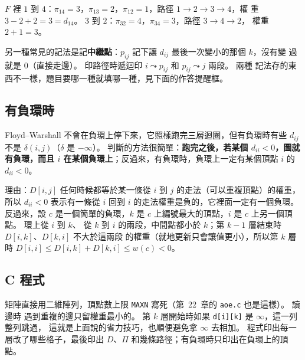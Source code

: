 $F$ 裡 $1$ 到 $4$：$\pi_{14} = 3$，$\pi_{13} = 2$，$\pi_{12} = 1$，路徑 $1 \to 2 \to 3 \to 4$，權
重 $3 - 2 + 2 = 3 = d_{14}$。 $3$ 到 $2$：$\pi_{32} = 4$，$\pi_{34} = 3$，路徑 $3 \to 4 \to 2$，
權重 $2 + 1 = 3$。

另一種常見的記法是記\textbf{中繼點}：$p_{ij}$ 記下讓 $d_{ij}$ 最後一次變小的那個 $k$，沒有變
過就是 $0$（直接走邊）。 印路徑時遞迴印 $i \leadsto p_{ij}$ 和 $p_{ij} \leadsto j$ 兩段。 兩種
記法存的東西不一樣，題目要哪一種就填哪一種，見下面的作答提醒框。

\subsection{有負環時}

Floyd--Warshall 不會在負環上停下來，它照樣跑完三層迴圈，但有負環時有些 $d_{ij}$ 不是
$\delta(i, j)$（$\delta$ 是 $-\infty$）。 判斷的方法很簡單：\textbf{跑完之後，若某個
$d_{ii} < 0$，圖就有負環，而且 $i$ 在某個負環上}；反過來，有負環時，負環上一定有某個頂點
$i$ 的 $d_{ii} < 0$。

理由：$D[i, j]$ 任何時候都等於某一條從 $i$ 到 $j$ 的走法（可以重複頂點）的權重，所以
$d_{ii} < 0$ 表示有一條從 $i$ 回到 $i$ 的走法權重是負的，它裡面一定有一個負環。 反過來，設
$c$ 是一個簡單的負環，$k$ 是 $c$ 上編號最大的頂點，$i$ 是 $c$ 上另一個頂點。 環上從 $i$ 到 $k$、
從 $k$ 到 $i$ 的兩段，中間點都小於 $k$；第 $k - 1$ 層結束時 $D[i, k]$、$D[k, i]$ 不大於這兩段
的權重（就地更新只會讓值更小），所以第 $k$ 層時 $D[i, i] \le D[i, k] + D[k, i] \le w(c) < 0$。

\subsection{C 程式}

矩陣直接用二維陣列，頂點數上限 \texttt{MAXN} 寫死（第~22~章的 \texttt{aoe.c} 也是這樣）。 讀邊時
遇到重複的邊只留權重最小的。 第 $k$ 層開始時如果 \texttt{d[i][k]} 是 $\infty$，這一列整列跳過，
這就是上面說的省力技巧，也順便避免拿 $\infty$ 去相加。 程式印出每一層改了哪些格子，最後印出
$D$、$\Pi$ 和幾條路徑；有負環時只印出在負環上的頂點。

